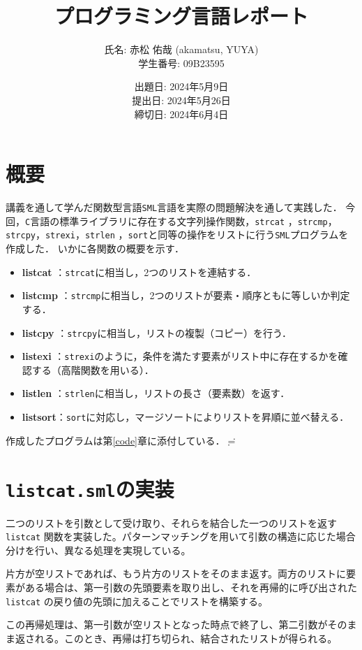 \documentclass[autodetect-engine,dvi=dvipdfmx,ja=standard,
               a4j,11pt]{bxjsarticle}
\title{プログラミング言語レポート}
\author{氏名: 赤松 佑哉 (akamatsu, YUYA) \\
        学生番号: 09B23595}
\date{出題日: 2024年5月9日 \\
      提出日: 2024年5月26日 \\
      締切日: 2024年6月4日 \\}  %
\begin{document}
\maketitle
\section{概要}
講義を通して学んだ関数型言語\verb|SML|言語を実際の問題解決を通して実践した．
今回，\verb|C|言語の標準ライブラリに存在する文字列操作関数，\verb|strcat|
，\verb|strcmp|，\verb|strcpy|，\verb|strexi|，\verb|strlen|
，\verb|sort|と同等の操作をリストに行う\verb|SML|プログラムを作成した．
いかに各関数の概要を示す．
\begin{itemize}
    \item \textbf{listcat} ：\verb|strcat|に相当し，2つのリストを連結する．
    \item \textbf{listcmp} ：\verb|strcmp|に相当し，2つのリストが要素・順序ともに等しいか判定する．
    \item \textbf{listcpy} ：\verb|strcpy|に相当し，リストの複製（コピー）を行う．
    \item \textbf{listexi} ：\verb|strexi|のように，条件を満たす要素がリスト中に存在するかを確認する（高階関数を用いる）．
    \item \textbf{listlen} ：\verb|strlen|に相当し，リストの長さ（要素数）を返す．
    \item \textbf{listsort}：\verb|sort|に対応し，マージソートによりリストを昇順に並べ替える．
\end{itemize}
作成したプログラムは第\ref{code}章に添付している．$\risingdotseq $
\section{\texttt{listcat.sml}の実装}

二つのリストを引数として受け取り、それらを結合した一つのリストを返す \verb|listcat| 関数を実装した。パターンマッチングを用いて引数の構造に応じた場合分けを行い、異なる処理を実現している。

片方が空リストであれば、もう片方のリストをそのまま返す。両方のリストに要素がある場合は、第一引数の先頭要素を取り出し、それを再帰的に呼び出された \verb|listcat| の戻り値の先頭に加えることでリストを構築する。

この再帰処理は、第一引数が空リストとなった時点で終了し、第二引数がそのまま返される。このとき、再帰は打ち切られ、結合されたリストが得られる。
\end{document}
